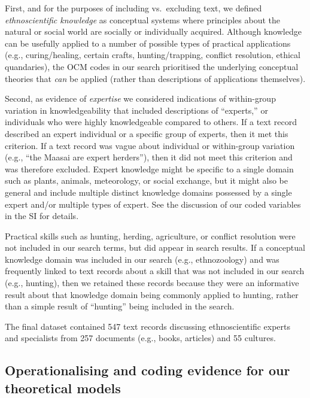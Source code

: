 \documentclass[
  11pt,
]{article}
\begin{document}
First, and for the purposes of including vs.~excluding text, we defined \emph{ethnoscientific knowledge} as conceptual systems where principles about the natural or social world are socially or individually acquired. Although knowledge can be usefully applied to a number of possible types of practical applications (e.g., curing/healing, certain crafts, hunting/trapping, conflict resolution, ethical quandaries), the OCM codes in our search prioritised the underlying conceptual theories that \emph{can} be applied (rather than descriptions of applications themselves).

Second, as evidence of \emph{expertise} we considered indications of within-group variation in knowledgeability that included descriptions of ``experts,'' or individuals who were highly knowledgeable compared to others. If a text record described an expert individual or a specific group of experts, then it met this criterion. If a text record was vague about individual or within-group variation (e.g., ``the Maasai are expert herders''), then it did not meet this criterion and was therefore excluded. Expert knowledge might be specific to a single domain such as plants, animals, meteorology, or social exchange, but it might also be general and include multiple distinct knowledge domains possessed by a single expert and/or multiple types of expert. See the discussion of our coded variables in the SI for details.

Practical skills such as hunting, herding, agriculture, or conflict resolution were not included in our search terms, but did appear in search results. If a conceptual knowledge domain was included in our search (e.g., ethnozoology) and was frequently linked to text records about a skill that was not included in our search (e.g., hunting), then we retained these records because they were an informative result about that knowledge domain being commonly applied to hunting, rather than a simple result of ``hunting'' being included in the search.

The final dataset contained 547 text records discussing ethnoscientific experts and specialists from 257 documents (e.g., books, articles) and 55 cultures.

\hypertarget{operationalising-and-coding-evidence-for-our-theoretical-models}{%
\subsection{Operationalising and coding evidence for our theoretical models}\label{operationalising-and-coding-evidence-for-our-theoretical-models}}
\end{document}
